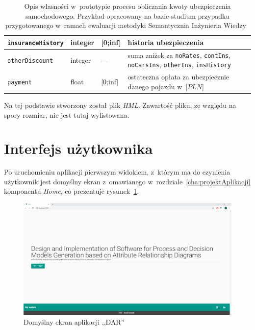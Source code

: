 \begin{table}
\begin{tabular}{|p{3.6cm}|p{1.4cm}|p{1.8cm}|p{7cm}|}
    \texttt{insuranceHistory} & integer & [0;inf] & historia ubezpieczenia \\ \hline
    \texttt{otherDiscount} & integer & --- & suma zniżek za \texttt{noRates}, \texttt{contIns}, \newline \texttt{noCarsIns}, \texttt{otherIns}, \texttt{insHistory} \\ \hline
    \texttt{payment} & float & [0;inf] & ostateczna opłata za ubezpiecznie danego pojazdu w~[$PLN$]\\ \hline
    \end{tabular}\vspace{-2mm}
       \caption{Opis własności w~prototypie procesu obliczania kwoty ubezpieczenia samochodowego. Przykład opracowany na bazie studium przypadku przygotowanego w~ramach ewaluacji metodyki Semantycznia Inżynieria Wiedzy~\cite{gjn2011hab} }
       \label{tab:att}
    \vspace{-3mm}
\end{table} 
Na tej podstawie stworzony został plik \emph{HML}. Zawartość pliku, ze względu na spory rozmiar, nie jest tutaj wylistowana.


\section{Interfejs użytkownika}
\label{sec:interfejsUżytkownika}
Po uruchomieniu aplikacji pierwszym widokiem, z~którym ma do czynienia użytkownik jest domyślny ekran z~omawianego w~rozdziale~\ref{cha:projektAplikacji} komponentu \emph{Home}, co prezentuje rysunek~\ref{fig:darHome}.
\begin{figure}
    \centering
    \includegraphics[width=\textwidth]{./assets/darHome.png}
    \caption{Domyślny ekran aplikacji ,,DAR''}
    \label{fig:darHome}
\end{figure} 

